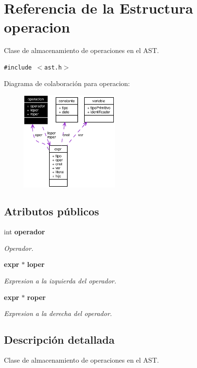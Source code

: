 \section{Referencia de la Estructura operacion}
\label{structoperacion}
Clase de almacenamiento de operaciones en el AST.  


{\tt \#include $<$ast.h$>$}

Diagrama de colaboraci\'{o}n para operacion:\begin{figure}[H]
\begin{center}
\leavevmode
\includegraphics[width=141pt]{structoperacion__coll__graph}
\end{center}
\end{figure}
\subsection*{Atributos p\'{u}blicos}
\begin{CompactItemize}
\item 
int {\bf operador}
\begin{CompactList}\small\item\em Operador. \item\end{CompactList}\item 
{\bf expr} $\ast$ {\bf loper}
\begin{CompactList}\small\item\em Expresion a la izquierda del operador. \item\end{CompactList}\item 
{\bf expr} $\ast$ {\bf roper}
\begin{CompactList}\small\item\em Expresion a la derecha del operador. \item\end{CompactList}\end{CompactItemize}


\subsection{Descripci\'{o}n detallada}
Clase de almacenamiento de operaciones en el AST. 



